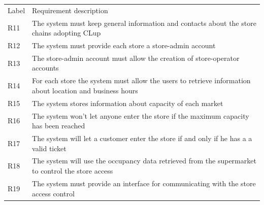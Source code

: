 \renewcommand{\arraystretch}{1.4}
\begin{tabular}{C{1cm}L{14.1cm}}
    Label & Requirement description                                                                                                                                                                     \\

    R11   & The system must keep general information and contacts about the store chains adopting CLup                                                                                                  \\
    R12   & The system must provide each store a store-admin account                                                                                                                                    \\
    R13   & The store-admin account must allow the creation of store-operator accounts                                                                                                                  \\
    R14   & For each store the system must allow the users to retrieve information about location and business hours                                                                                    \\
    R15   & The system stores information about capacity of each market                                                                                                                                 \\
    R16   & The system won't let anyone enter the store if the maximum capacity has been reached                                                                                                        \\
    R17   & The system will let a customer enter the store if and only if he has a a valid ticket                                                                                                       \\
    R18   & The system will use the occupancy data retrieved from the supermarket to control the store access                                                                                           \\
    R19   & The system must provide an interface for communicating with the store access control                                                                                                        \\

\end{tabular}
